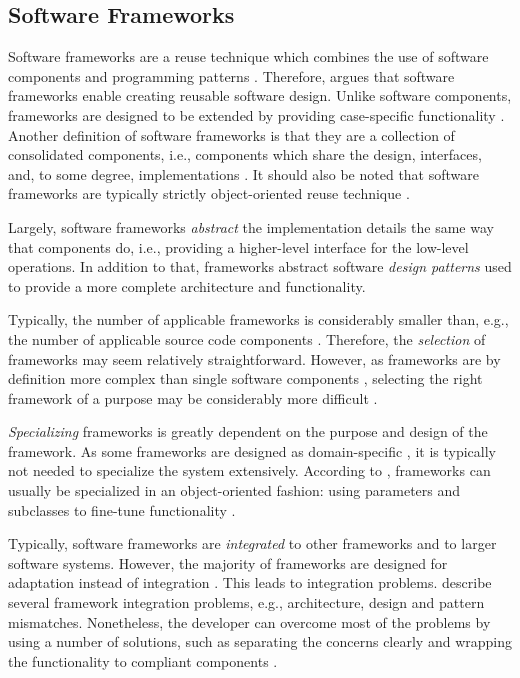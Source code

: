\subsection{Software Frameworks}

Software frameworks are a reuse technique which combines the use of software components and programming patterns \citep{johnson_frameworkscomponents+_1997}. Therefore, \citet{johnson_frameworkscomponents+_1997} argues that software frameworks enable creating reusable software design. Unlike software components, frameworks are designed to be extended by providing case-specific functionality \citep{lambeau_software_2011}. Another definition of software frameworks is that they are a collection of consolidated components, i.e., components which share the design, interfaces, and, to some degree, implementations \citep{johnson_frameworkscomponents+_1997}. It should also be noted that software frameworks are typically strictly object-oriented reuse technique \citep{johnson_frameworkscomponents+_1997}.

Largely, software frameworks \emph{abstract} the implementation details the same way that components do, i.e., providing a higher-level interface for the low-level operations. In addition to that, frameworks abstract software \emph{design patterns} used to provide a more complete architecture and functionality.

Typically, the number of applicable frameworks is considerably smaller than, e.g., the number of applicable source code components \citep{fayad_enterprise_2000}. Therefore, the \emph{selection} of frameworks may seem relatively straightforward. However, as frameworks are by definition more complex than single software components \citep{johnson_frameworkscomponents+_1997}, selecting the right framework of a purpose may be considerably more difficult \citep{fayad_enterprise_2000}.

\emph{Specializing} frameworks is greatly dependent on the purpose and design of the framework. As some frameworks are designed as domain-specific \citep{johnson_frameworkscomponents+_1997}, it is typically not needed to specialize the system extensively. According to \citet{brugali_framework_1997}, frameworks can usually be specialized in an object-oriented fashion: using parameters and subclasses to fine-tune functionality \citep{brugali_framework_1997}.

Typically, software frameworks are \emph{integrated} to other frameworks and to larger software systems. However, the majority of frameworks are designed for adaptation instead of integration \citep{mattsson_framework_1999}. This leads to integration problems. \citet{mattsson_framework_1999} describe several framework integration problems, e.g., architecture, design and pattern mismatches. Nonetheless, the developer can overcome most of the problems by using a number of solutions, such as separating the concerns clearly and wrapping the functionality to compliant components \citep{mattsson_framework_1999}.

